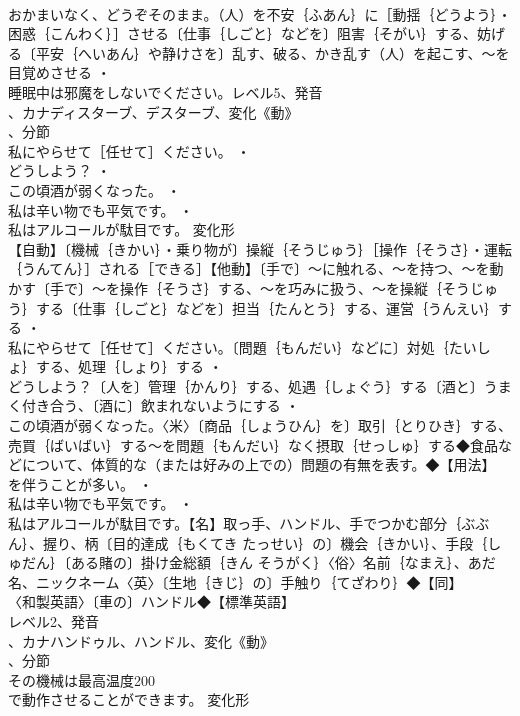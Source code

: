\documentclass[8pt]{extreport}
\begin{document}
\begin{CJK}{UTF8}{min}
\\	おかまいなく、どうぞそのまま。（人）を不安｛ふあん｝に［動揺｛どうよう｝・困惑｛こんわく｝］させる〔仕事｛しごと｝などを〕阻害｛そがい｝する、妨げる〔平安｛へいあん｝や静けさを〕乱す、破る、かき乱す（人）を起こす、～を目覚めさせる ・
\\	睡眠中は邪魔をしないでください。レベル5、発音
\\	、カナディスターブ、デスターブ、変化《動》
\\	、分節
\\	私にやらせて［任せて］ください。 ・
\\	どうしよう？ ・
\\	この頃酒が弱くなった。 ・
\\	私は辛い物でも平気です。 ・
\\	私はアルコールが駄目です。	変化形 
\\	【自動】〔機械｛きかい｝・乗り物が〕操縦｛そうじゅう｝［操作｛そうさ｝・運転｛うんてん｝］される［できる］【他動】〔手で〕～に触れる、～を持つ、～を動かす〔手で〕～を操作｛そうさ｝する、～を巧みに扱う、～を操縦｛そうじゅう｝する〔仕事｛しごと｝などを〕担当｛たんとう｝する、運営｛うんえい｝する ・
\\	私にやらせて［任せて］ください。〔問題｛もんだい｝などに〕対処｛たいしょ｝する、処理｛しょり｝する ・
\\	どうしよう？〔人を〕管理｛かんり｝する、処遇｛しょぐう｝する〔酒と〕うまく付き合う、〔酒に〕飲まれないようにする ・
\\	この頃酒が弱くなった。〈米〉〔商品｛しょうひん｝を〕取引｛とりひき｝する、売買｛ばいばい｝する～を問題｛もんだい｝なく摂取｛せっしゅ｝する◆食品などについて、体質的な（または好みの上での）問題の有無を表す。◆【用法】
\\	を伴うことが多い。 ・
\\	私は辛い物でも平気です。 ・
\\	私はアルコールが駄目です。【名】取っ手、ハンドル、手でつかむ部分｛ぶぶん｝、握り、柄〔目的達成｛もくてき たっせい｝の〕機会｛きかい｝、手段｛しゅだん｝〔ある賭の〕掛け金総額｛きん そうがく｝〈俗〉名前｛なまえ｝、あだ名、ニックネーム〈英〉〔生地｛きじ｝の〕手触り｛てざわり｝◆【同】
\\	〈和製英語〉〔車の〕ハンドル◆【標準英語】
\\	レベル2、発音
\\	、カナハンドゥル、ハンドル、変化《動》
\\	、分節
\\	その機械は最高温度200
\\	で動作させることができます。	変化形 

\end{CJK}
\end{document}

